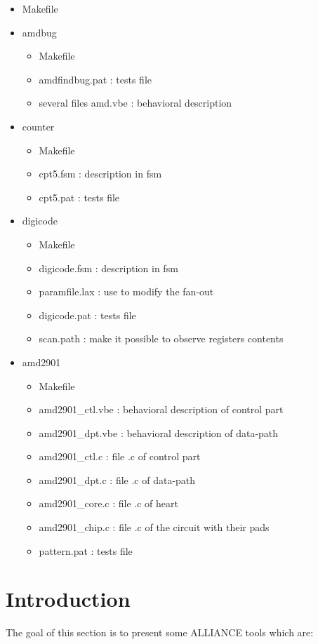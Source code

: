\documentclass[12pt]{article}
\begin{document}
{\begin{itemize}
\item   Makefile
\item   amdbug
    \begin{itemize}\itemsep=-.8ex
    \item   Makefile
    \item   amdfindbug.pat : tests file
    \item   several files amd.vbe : behavioral description
    \end{itemize}
\item   counter
    \begin{itemize}\itemsep=-.8ex
    \item   Makefile
    \item   cpt5.fsm : description in fsm
    \item   cpt5.pat : tests file
    \end{itemize}
\item   digicode
    \begin{itemize}\itemsep=-.8ex
    \item   Makefile
    \item   digicode.fsm : description in fsm
    \item   paramfile.lax : use to modify the fan-out
    \item   digicode.pat : tests file
    \item   scan.path : make it possible to observe registers
    contents
    \end{itemize}
\item   amd2901
    \begin{itemize}\itemsep=-.8ex
    \item   Makefile
    \item   amd2901\_ctl.vbe : behavioral description of control
    part
    \item   amd2901\_dpt.vbe : behavioral description of data-path
    \item   amd2901\_ctl.c : file .c of control part
    \item   amd2901\_dpt.c : file .c of data-path
    \item   amd2901\_core.c : file .c of heart
    \item   amd2901\_chip.c : file .c of the circuit with their
    pads
    \item   pattern.pat : tests file
    \end{itemize}
\end{itemize}


\newpage
\section{Introduction}
    The goal of this section is to present some ALLIANCE tools which are:

}
\end{document}
